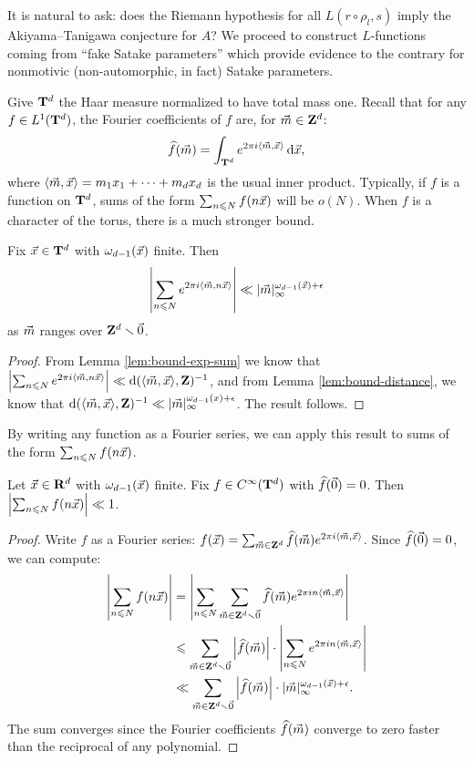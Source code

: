 It is natural to ask: does the Riemann hypothesis for all $L(r\circ \rho_l,s)$ 
imply the Akiyama--Tanigawa conjecture for $A$? We proceed to construct 
$L$-functions coming from ``fake Satake parameters'' which provide evidence to 
the contrary for nonmotivic (non-automorphic, in fact) Satake parameters. 

Give $\mathbf{T}^d$ the Haar measure normalized to have total mass one. 
Recall that for any $f\in L^1(\mathbf{T}^d)$, the Fourier coefficients of $f$ 
are, for $\vec{m}\in \mathbf{Z}^d$: 
\[
	\widehat f(\vec{m}) = \int_{\mathbf{T}^d} e^{2\pi i \langle \vec{m},\vec{x}\rangle} \, \mathrm{d} \vec{x} ,
\]
where $\langle \vec{m},\vec{x}\rangle = m_1 x_1 + \cdots + m_d x_d$ is the usual inner 
product. Typically, if $f$ is a function on $\mathbf{T}^d$, sums of the form 
$\sum_{n\leqslant N} f(n \vec{x})$ will be $o(N)$. When $f$ is a character of the 
torus, there is a much stronger bound. 

\begin{theorem}
Fix $\vec{x}\in \mathbf{T}^d$ with $\omega_{d-1}(\vec{x})$ finite. Then 
\[
	\left| \sum_{n\leqslant N} e^{2\pi i \langle \vec{m}, n \vec{x}\rangle}\right| \ll |\vec{m}|_\infty^{\omega_{d-1}(\vec{x}) + \epsilon} 
\]
as $\vec{m}$ ranges over $\mathbf{Z}^d\smallsetminus \vec{0}$. 
\end{theorem}
\begin{proof}
From Lemma \ref{lem:bound-exp-sum} we know that 
$\left| \sum_{n\leqslant N} e^{2\pi i \langle \vec{m}, n \vec{x}\rangle}\right| \ll \mathrm{d}(\langle \vec{m}, \vec{x}\rangle,\mathbf{Z})^{-1}$, 
and from Lemma \ref{lem:bound-distance}, we know that 
$\mathrm{d}(\langle \vec{m},\vec{x}\rangle, \mathbf{Z})^{-1} \ll |\vec{m}|_\infty^{\omega_{d-1}(x)+\epsilon}$. 
The result follows. 
\end{proof}

By writing any function as a Fourier series, we can apply this result to sums 
of the form $\sum_{n\leqslant N} f(n \vec{x})$. 

\begin{theorem}\label{thm:translates-bound-sum}
Let $\vec{x}\in \mathbf{R}^d$ with $\omega_{d-1}(\vec{x})$ finite. Fix 
$f\in C^\infty(\mathbf{T}^d)$ with $\widehat f(\vec{0})=0$. Then 
$\left| \sum_{n\leqslant N} f(n \vec{x})\right| \ll 1$. 
\end{theorem}
\begin{proof}
Write $f$ as a Fourier series:
$f(\vec{x}) = \sum_{\vec{m}\in \mathbf{Z}^d} \widehat f(\vec{m}) e^{2\pi i \langle \vec{m},\vec{x}\rangle}$. 
Since $\widehat f(\vec{0})=0$, we can compute:
\begin{align*}
	\left| \sum_{n\leqslant N} f(n \vec{x})\right| 
		&= \left| \sum_{n\leqslant N} \sum_{\vec{m}\in \mathbf{Z}^d\smallsetminus \vec{0}} \widehat f(\vec{m}) e^{2\pi i n \langle \vec{m},\vec{x}\rangle}\right| \\
		&\leqslant \sum_{\vec{m}\in \mathbf{Z}^d\smallsetminus \vec{0}} \left|\widehat f(\vec{m})\right|\cdot \left| \sum_{n\leqslant N} e^{2\pi i n \langle \vec{m},\vec{x}\rangle}\right| \\
		&\ll \sum_{\vec{m}\in \mathbf{Z}^d\smallsetminus \vec{0}} \left|\widehat f(\vec{m})\right|\cdot |\vec{m}|_\infty^{\omega_{d-1}(\vec{x}) + \epsilon} .
\end{align*}
The sum converges since the Fourier coefficients $\widehat f(\vec{m})$ converge to 
zero faster than the reciprocal of any polynomial. 
\end{proof}

